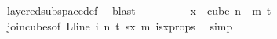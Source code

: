 \begin{isabellebody}
\ layered{\isacharunderscore}{\kern0pt}subspace{\isacharunderscore}{\kern0pt}def\ \isamarkupfalse%
\ blast\isanewline
\ \ \ \ \ \ \isamarkupfalse%
\ \isamarkupfalse%
\ {\isachardoublequoteopen}x\ {\isasymin}\ cube\ {\isacharparenleft}{\kern0pt}n\ {\isacharplus}{\kern0pt}\ m{\isacharparenright}{\kern0pt}\ {\isacharparenleft}{\kern0pt}t{\isacharplus}{\kern0pt}{}{\isacharparenright}{\kern0pt}{\isachardoublequoteclose}\ \isamarkupfalse%
\ join{\isacharunderscore}{\kern0pt}cubes{\isacharbrackleft}{\kern0pt}of\ {\isachardoublequoteopen}L{\isacharunderscore}{\kern0pt}line\ i{\isachardoublequoteclose}\ {\isachardoublequoteopen}n{\isachardoublequoteclose}\ {\isachardoublequoteopen}t{\isachardoublequoteclose}\ sx\ m{\isacharbrackright}{\kern0pt}\ isx{\isacharunderscore}{\kern0pt}props\ \isamarkupfalse%
\ simp\ \isanewline
\ \ \ \ \isamarkupfalse%
\isanewline
\ \ \ \ \ \ \isanewline
\isanewline
\isanewline
\isanewline
\isanewline
\ \ \ \ \isamarkupfalse%

\end{isabellebody}
